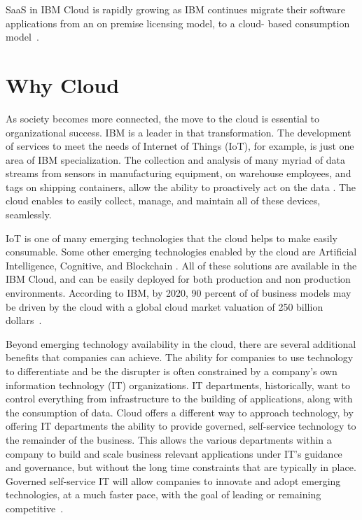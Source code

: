 SaaS in IBM Cloud is rapidly growing as IBM continues migrate their
software applications from an on premise licensing model, to a cloud-
based consumption model~\cite{hid-sp18-525-overview}.


\section{Why Cloud}

As society becomes more connected, the move to the cloud is essential
to organizational success. IBM is a leader in that transformation. The
development of services to meet the needs of Internet of Things (IoT),
for example, is just one area of IBM specialization. The collection
and analysis of many myriad of data streams from sensors in
manufacturing equipment, on warehouse employees, and tags on shipping
containers, allow the ability to proactively act on the data
\cite{hid-sp18-525-winning}. The cloud enables to easily collect,
manage, and maintain all of these devices, seamlessly.

IoT is one of many emerging technologies that the cloud helps to make
easily consumable. Some other emerging technologies enabled by the
cloud are Artificial Intelligence, Cognitive, and Blockchain
\cite{hid-sp18-525-winning}. All of these solutions are available in
the IBM Cloud, and can be easily deployed for both production and non
production environments. According to IBM, by 2020, 90 percent of of
business models may be driven by the cloud with a global cloud market
valuation of 250 billion dollars~\cite{hid-sp18-525-winning}.

Beyond emerging technology availability in the cloud, there are
several additional benefits that companies can achieve. The ability
for companies to use technology to differentiate and be the disrupter
is often constrained by a company's own information technology (IT)
organizations. IT departments, historically, want to control
everything from infrastructure to the building of applications, along
with the consumption of data. Cloud offers a different way to approach
technology, by offering IT departments the ability to provide
governed, self-service technology to the remainder of the business.
This allows the various departments within a company to build and
scale business relevant applications under IT's guidance and
governance, but without the long time constraints that are typically
in place. Governed self-service IT will allow companies to innovate
and adopt emerging technologies, at a much faster pace, with the goal
of leading or remaining competitive~\cite{hid-sp18-525-overview}.


